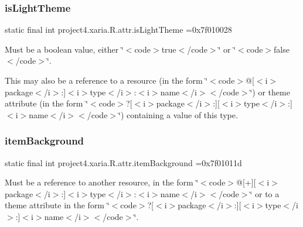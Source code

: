 \subsubsection{\texorpdfstring{is\+Light\+Theme}{isLightTheme}}
{\footnotesize\ttfamily static final int project4.\+xaria.\+R.\+attr.\+is\+Light\+Theme =0x7f010028\hspace{0.3cm}{\ttfamily [static]}}

Must be a boolean value, either \char`\"{}$<$code$>$true$<$/code$>$\char`\"{} or \char`\"{}$<$code$>$false$<$/code$>$\char`\"{}. 

This may also be a reference to a resource (in the form \char`\"{}$<$code$>$@\mbox{[}$<$i$>$package$<$/i$>$\+:\mbox{]}$<$i$>$type$<$/i$>$\+:$<$i$>$name$<$/i$>$$<$/code$>$\char`\"{}) or theme attribute (in the form \char`\"{}$<$code$>$?\mbox{[}$<$i$>$package$<$/i$>$\+:\mbox{]}\mbox{[}$<$i$>$type$<$/i$>$\+:\mbox{]}$<$i$>$name$<$/i$>$$<$/code$>$\char`\"{}) containing a value of this type. \mbox{\label{classproject4_1_1xaria_1_1R_1_1attr_ad4de3651a98e92d9b5bbc3f5aa585e19}} 
\subsubsection{\texorpdfstring{item\+Background}{itemBackground}}
{\footnotesize\ttfamily static final int project4.\+xaria.\+R.\+attr.\+item\+Background =0x7f01011d\hspace{0.3cm}{\ttfamily [static]}}

Must be a reference to another resource, in the form \char`\"{}$<$code$>$@\mbox{[}+\mbox{]}\mbox{[}$<$i$>$package$<$/i$>$\+:\mbox{]}$<$i$>$type$<$/i$>$\+:$<$i$>$name$<$/i$>$$<$/code$>$\char`\"{} or to a theme attribute in the form \char`\"{}$<$code$>$?\mbox{[}$<$i$>$package$<$/i$>$\+:\mbox{]}\mbox{[}$<$i$>$type$<$/i$>$\+:\mbox{]}$<$i$>$name$<$/i$>$$<$/code$>$\char`\"{}. \mbox{\label{classproject4_1_1xaria_1_1R_1_1attr_ae8c0f86007df076e9d9591bc9c8a172b}} 
